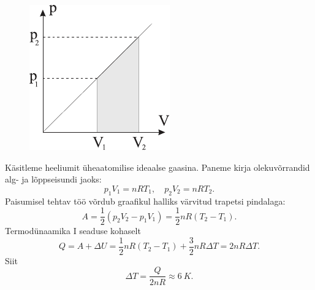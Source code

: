 \documentclass[10pt, twoside]{article}
\begin{document}
{%

\solu
\begin{figure}
	\begin{center}
		\vspace{-25pt}
		\includegraphics[width=0.95\linewidth]{2008-lahg-06-lah}
	\end{center}
\end{figure}
Käsitleme heeliumit üheaatomilise ideaalse gaasina. 
Paneme kirja olekuvõrrandid alg- ja lõppseisundi jaoks:
\[
p_1V_1 = nRT_1, \quad p_2V_2 = nRT_2.
\]
Paisumisel tehtav töö võrdub graafikul halliks värvitud
trapetsi pindalaga:
\[
A = \frac 12 (p_2V_2 - p_1V_1) = \frac 12 nR(T_2 - T_1).
\]
Termodünaamika I seaduse kohaselt 
\[
Q = A + \Delta U = \frac 12 nR(T_2 - T_1) + \frac 32 nR\Delta T = 2nR\Delta T.
\]
Siit
\[
\Delta T =\frac {Q}{2nR} \approx \SI{6}{K}.
\]
\probend
\bigskip


}
\end{document}
